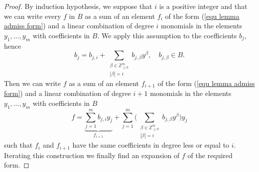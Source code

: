 \documentclass{amsart}%
\numberwithin{equation}{subsection}
\theoremstyle{plain2}
\theoremstyle{definition2}
\theoremstyle{stepstyle}
\theoremstyle{point}
\theoremstyle{subpoint}
\newcommand{\Z}{\ensuremath{\mathbb{Z}}}
\begin{document}
{\begin{proof}
By induction hypothesis, we suppose that $i$ is a positive integer and that we can write every $f$ in $B$ as a sum of an element $f_i$ of the form (\ref{equ lemma admiss form}) and a linear combination of degree $i$ monomials in the elements $y_1,\ldots, y_m$ with coefficients in $B$. We apply this assumption to the coefficients $b_j$, hence
$$b_j=b_{j,i} + \sum_{\substack{\beta \in \Z^m_{\geqslant 0} \\|\beta|=i}} b_{j,\beta} y^\beta, \quad b_{j, \beta} \in B.$$ Then we can write $f$ as a sum of an element $f_{i+1}$ of the form (\ref{equ lemma admiss form}) and a linear combination of degree $i+1$ monomials in the elements $y_1,\ldots,y_m$ with coefficients in $B$
$$ f=\underbrace{\sum_{j=1}^{m} b_{j,i} y_j}_{f_{i+1}} + \sum_{j=1}^{m}\Big( \sum_{\substack{\beta \in \Z^m_{\geqslant 0} \\|\beta|=i}} b_{j,\beta} y^\beta \Big) y_j$$ such that $f_i$ and $f_{i+1}$ have the same coefficients in degree less or equal to $i$. Iterating this construction we finally find an expansion of $f$ of the required form.
\end{proof}}
\end{document}
